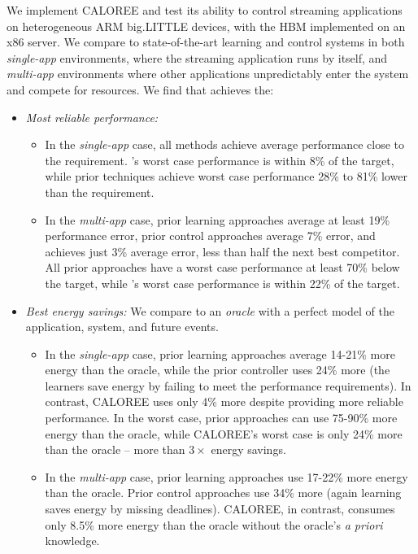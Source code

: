 We implement CALOREE and test its ability to control streaming
applications on heterogeneous ARM big.LITTLE devices, with the HBM
implemented on an x86 server.  We compare to state-of-the-art learning
and control systems in both \emph{single-app} environments, where the
streaming application runs by itself, and \emph{multi-app}
environments where other applications unpredictably enter the system
and compete for resources. We find that \SYSTEM{} achieves the:
\begin{itemize}
\item \textit{Most reliable performance:} 
  \begin{itemize} 
  \item In the \emph{single-app} case, all methods achieve average
    performance close to the requirement.  \SYSTEM{}'s worst case
    performance is within 8\% of the target, while prior techniques
    achieve worst case performance 28\% to 81\% lower than the
    requirement.
  \item In the \emph{multi-app} case, prior learning approaches
    average at least 19\% performance error, prior control approaches
    average 7\% error, and \SYSTEM{} achieves just 3\% average error,
    less than half the next best competitor.  All prior approaches
    have a worst case performance at least 70\% below the target,
    while \SYSTEM{}'s worst case performance is within 22\% of the
    target.
    \end{itemize}
  \item \textit{Best energy savings:} We compare to an \emph{oracle}
    with a perfect model of the application, system, and future
    events.
    \begin{itemize}
    \item In the \emph{single-app} case, prior learning approaches
      average 14-21\% more energy than the oracle, while the prior
      controller uses 24\% more (the learners save energy by failing
      to meet the performance requirements).  In contrast, CALOREE
      uses only 4\% more despite providing more reliable performance.
      In the worst case, prior approaches can use 75-90\% more energy
      than the oracle, while CALOREE's worst case is only 24\% more
      than the oracle -- more than $3\times$ energy savings.
    \item In the \emph{multi-app} case, prior learning approaches use
      17-22\% more energy than the oracle.  Prior control approaches
      use 34\% more (again learning saves energy by missing
      deadlines).  CALOREE, in contrast, consumes only 8.5\% more
      energy than the oracle without the oracle's {\em a priori}
      knowledge.
    \end{itemize}
\end{itemize}

